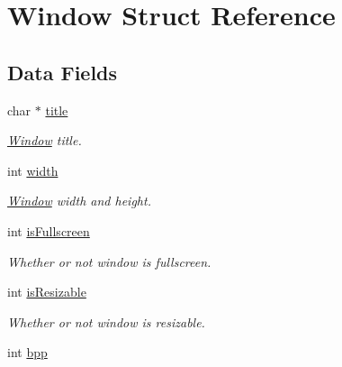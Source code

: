 \hypertarget{structWindow}{
\section{Window Struct Reference}
\label{structWindow}
}
\subsection*{Data Fields}
\begin{DoxyCompactItemize}
\item 
\hypertarget{structWindow_a2712e1af7ae5101a41ba0a2eadbd1ce8}{
char $\ast$ \hyperlink{structWindow_a2712e1af7ae5101a41ba0a2eadbd1ce8}{title}}
\label{structWindow_a2712e1af7ae5101a41ba0a2eadbd1ce8}

\begin{DoxyCompactList}\small\item\em \hyperlink{structWindow}{Window} title. \item\end{DoxyCompactList}\item 
\hypertarget{structWindow_af5b1c436782cc9752d386493fbc5dc8c}{
int \hyperlink{structWindow_af5b1c436782cc9752d386493fbc5dc8c}{width}}
\label{structWindow_af5b1c436782cc9752d386493fbc5dc8c}

\begin{DoxyCompactList}\small\item\em \hyperlink{structWindow}{Window} width and height. \item\end{DoxyCompactList}\item 
\hypertarget{structWindow_a21fee4283f7f248cdc4a242853ff8387}{
int \hyperlink{structWindow_a21fee4283f7f248cdc4a242853ff8387}{isFullscreen}}
\label{structWindow_a21fee4283f7f248cdc4a242853ff8387}

\begin{DoxyCompactList}\small\item\em Whether or not window is fullscreen. \item\end{DoxyCompactList}\item 
\hypertarget{structWindow_a92be3a705b81516b4643b24f16c6d562}{
int \hyperlink{structWindow_a92be3a705b81516b4643b24f16c6d562}{isResizable}}
\label{structWindow_a92be3a705b81516b4643b24f16c6d562}

\begin{DoxyCompactList}\small\item\em Whether or not window is resizable. \item\end{DoxyCompactList}\item 
\hypertarget{structWindow_a626486f1bf91301cc2d1447bfc7c9108}{
int \hyperlink{structWindow_a626486f1bf91301cc2d1447bfc7c9108}{bpp}}
\label{structWindow_a626486f1bf91301cc2d1447bfc7c9108}


\end{DoxyCompactItemize}
